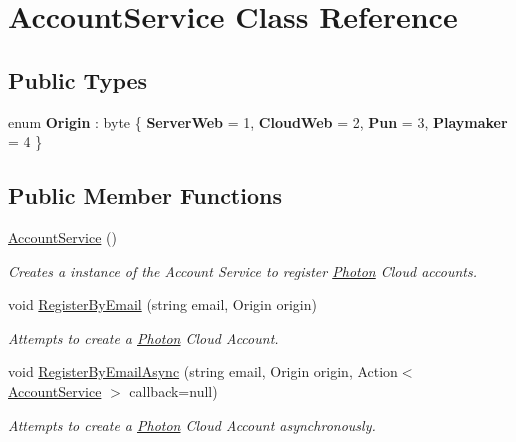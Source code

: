 \hypertarget{class_account_service}{}\section{Account\+Service Class Reference}
\label{class_account_service}
\subsection*{Public Types}
\begin{DoxyCompactItemize}
\item 
enum {\bfseries Origin} \+: byte \{ {\bfseries Server\+Web} = 1, 
{\bfseries Cloud\+Web} = 2, 
{\bfseries Pun} = 3, 
{\bfseries Playmaker} = 4
 \}\hypertarget{class_account_service_ad255ee623b704af8d6995bd2a6eca292}{}\label{class_account_service_ad255ee623b704af8d6995bd2a6eca292}

\end{DoxyCompactItemize}
\subsection*{Public Member Functions}
\begin{DoxyCompactItemize}
\item 
\hyperlink{class_account_service_af440e845bf59207f2abab64155ac78fd}{Account\+Service} ()
\begin{DoxyCompactList}\small\item\em Creates a instance of the Account Service to register \hyperlink{namespace_photon}{Photon} Cloud accounts. \end{DoxyCompactList}\item 
void \hyperlink{class_account_service_a879044e72d8362127dd106cef0dee0a6}{Register\+By\+Email} (string email, Origin origin)
\begin{DoxyCompactList}\small\item\em Attempts to create a \hyperlink{namespace_photon}{Photon} Cloud Account. \end{DoxyCompactList}\item 
void \hyperlink{class_account_service_a21f4161e664bf917292634c78d96d343}{Register\+By\+Email\+Async} (string email, Origin origin, Action$<$ \hyperlink{class_account_service}{Account\+Service} $>$ callback=null)
\begin{DoxyCompactList}\small\item\em Attempts to create a \hyperlink{namespace_photon}{Photon} Cloud Account asynchronously. \end{DoxyCompactList}\end{DoxyCompactItemize}

